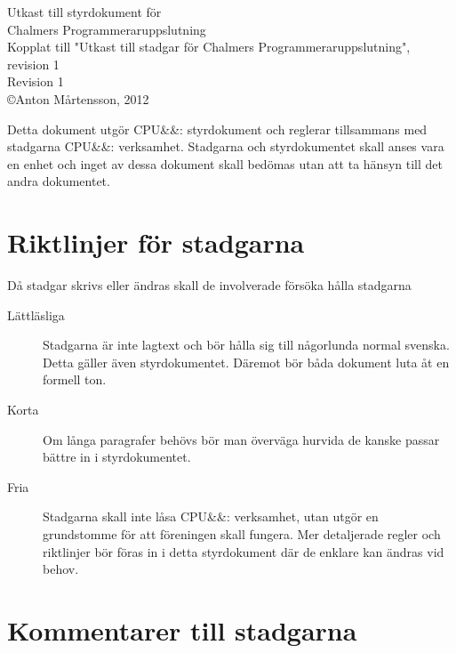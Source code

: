 \documentclass[a4paper]{article}
\newcommand\CPU[1][]{CPU\ifx&#1&\else:#1\fi\xspace}
\begin{document}
\begin{center}
	{\Huge Utkast till styrdokument för} \\[0.5em]
	{\Huge Chalmers Programmeraruppslutning} \\[1em]
	{Kopplat till "Utkast till stadgar för Chalmers Programmeraruppslutning", revision 1} \\[1em]
	{Revision 1} \\
	{\copyright Anton Mårtensson, 2012}
\end{center}

Detta dokument utgör \CPU{s} styrdokument och reglerar tillsammans med stadgarna \CPU{s} verksamhet. Stadgarna och styrdokumentet skall anses vara en enhet och inget av dessa dokument skall bedömas utan att ta hänsyn till det andra dokumentet.

\section{Riktlinjer för stadgarna}
Då stadgar skrivs eller ändras skall de involverade försöka hålla stadgarna
\begin{description}
\item[Lättläsliga] Stadgarna är inte lagtext och bör hålla sig till någorlunda normal svenska. Detta gäller även styrdokumentet. Däremot bör båda dokument luta åt en formell ton.
\item[Korta] Om långa paragrafer behövs bör man överväga hurvida de kanske passar bättre in i styrdokumentet.
\item[Fria] Stadgarna skall inte låsa \CPU{s} verksamhet, utan utgör en grundstomme för att föreningen skall fungera. Mer detaljerade regler och riktlinjer bör föras in i detta styrdokument där de enklare kan ändras vid behov.
\end{description}

\section{Kommentarer till stadgarna}
\def\commentheader#1{\textbf{#1}\\}


\end{document}
